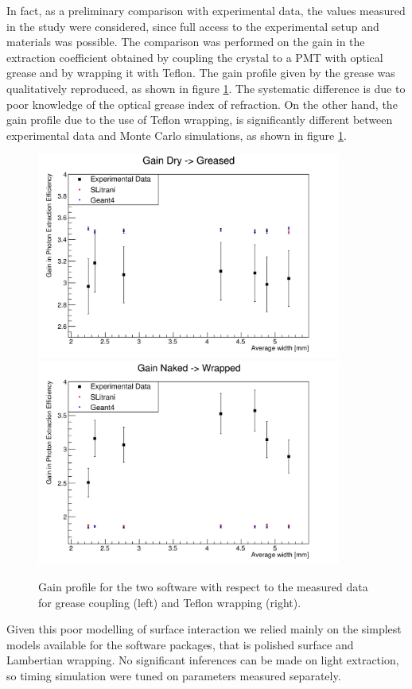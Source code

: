 In fact, as a preliminary comparison with experimental data, the values measured in the study \cite{Kris2012} were considered, since full access to the experimental setup and materials was possible. 
The comparison was performed on the gain in the extraction coefficient obtained by coupling the crystal to a PMT with optical grease and by wrapping it with Teflon.
The gain profile given by the grease was qualitatively reproduced, as shown in figure \ref{fig:gain}. The systematic difference is due to poor knowledge of the optical grease index of refraction. 
On the other hand, the gain profile due to the use of
Teflon wrapping, is significantly different between
experimental data and Monte Carlo simulations, as shown in figure \ref{fig:gain}.
\begin{figure}[htbp]
\begin{center}
\includegraphics[width=10cm]{../Pictures/Chapter_5/gain_grease.png}
\includegraphics[width=10cm]{../Pictures/Chapter_5/wrap_gain.png}
\end{center}
\caption[Geant4 SLitrani gain profiles]{Gain profile for the two software with respect to the measured data for grease coupling (left) and Teflon wrapping (right).}
\label{fig:gain}
\end{figure}
Given this poor modelling of surface interaction we relied mainly on the simplest models available for the software packages, that is polished surface and Lambertian wrapping. No significant inferences can be made on light extraction, so timing simulation were tuned on parameters measured separately.

